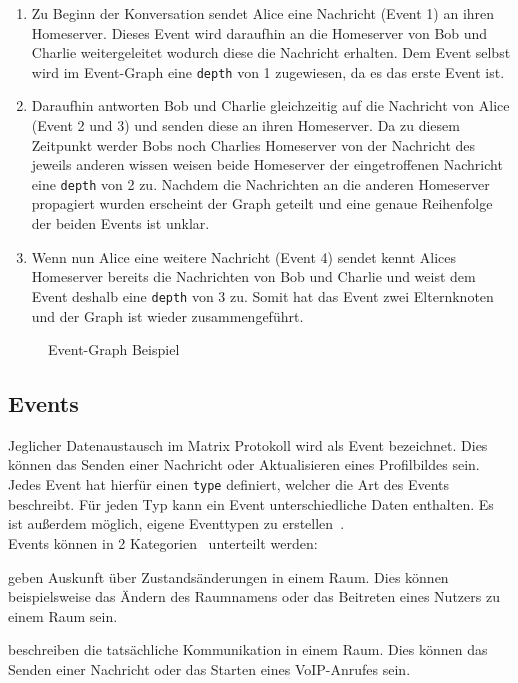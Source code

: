     \begin{enumerate}[label={(\arabic*)}]
    \item Zu Beginn der Konversation sendet Alice eine Nachricht (Event 1) an ihren Homeserver.
    Dieses Event wird daraufhin an die Homeserver von Bob und Charlie weitergeleitet wodurch diese die Nachricht erhalten.
    Dem Event selbst wird im Event-Graph eine \texttt{depth} von 1 zugewiesen, da es das erste Event ist.
    \item Daraufhin antworten Bob und Charlie gleichzeitig auf die Nachricht von Alice (Event 2 und 3) und senden diese an ihren Homeserver.
    Da zu diesem Zeitpunkt werder Bobs noch Charlies Homeserver von der Nachricht des jeweils anderen wissen weisen beide Homeserver der eingetroffenen Nachricht eine \texttt{depth} von 2 zu.
    Nachdem die Nachrichten an die anderen Homeserver propagiert wurden erscheint der Graph geteilt und eine genaue Reihenfolge der beiden Events ist unklar.
    \item Wenn nun Alice eine weitere Nachricht (Event 4) sendet kennt Alices Homeserver bereits die Nachrichten von Bob und Charlie und weist dem Event deshalb eine \texttt{depth} von 3 zu.
        Somit hat das Event zwei Elternknoten und der Graph ist wieder zusammengeführt.
    \end{enumerate}

\begin{figure}[h]
    \centering
    
    \caption{Event-Graph Beispiel}
    \label{fig:events}
\end{figure}

    \newpage
    \subsection{Events}\label{sec:events}
    Jeglicher Datenaustausch im Matrix Protokoll wird als Event bezeichnet.
    Dies können das Senden einer Nachricht oder Aktualisieren eines Profilbildes sein.
    Jedes Event hat hierfür einen \texttt{type} definiert, welcher die Art des Events beschreibt.
    Für jeden Typ kann ein Event unterschiedliche Daten enthalten.
    Es ist außerdem möglich, eigene Eventtypen zu erstellen~\cite{events}.\\
    Events können in 2 Kategorien~\cite{roomevents} unterteilt werden:
    \begin{description}[leftmargin=!,labelwidth=3.5cm]
        \item [State events] geben Auskunft über Zustandsänderungen in einem Raum. Dies können beispielsweise das Ändern des Raumnamens oder das Beitreten eines Nutzers zu einem Raum sein.
        \item [Message events] beschreiben die tatsächliche Kommunikation in einem Raum. Dies können das Senden einer Nachricht oder das Starten eines VoIP-Anrufes sein.
    \end{description}

